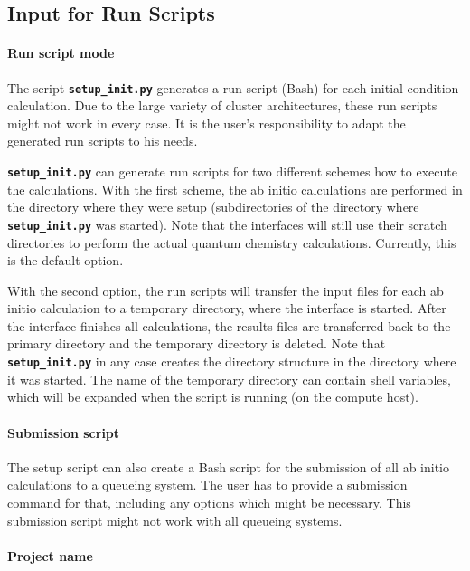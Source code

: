 \documentclass[a4paper,10pt,DIV=15,openany]{scrbook}
\newcommand{\ttt}[1]{\textbf{\texttt{#1}}}
\begin{document}

\subsection{Input for Run Scripts}\label{sec:setup_init.py:run}

\paragraph{Run script mode}

The script \ttt{setup\_init.py} generates a run script (Bash) for each initial condition calculation. Due to the large variety of cluster architectures, these run scripts might not work in every case. It is the user's responsibility to adapt the generated run scripts to his needs.

\ttt{setup\_init.py} can generate run scripts for two different schemes how to execute the calculations. With the first scheme, the ab initio calculations are performed in the directory where they were setup (subdirectories of the directory where \ttt{setup\_init.py} was started). Note that the interfaces will still use their scratch directories to perform the actual quantum chemistry calculations. Currently, this is the default option.

With the second option, the run scripts will transfer the input files for each ab initio calculation to a temporary directory, where the interface is started. After the interface finishes all calculations, the results files are transferred back to the primary directory and the temporary directory is deleted. Note that \ttt{setup\_init.py} in any case creates the directory structure in the directory where it was started. The name of the temporary directory can contain shell variables, which will be expanded when the script is running (on the compute host).

\paragraph{Submission script}

The setup script can also create a Bash script for the submission of all ab initio calculations to a queueing system. The user has to provide a submission command for that, including any options which might be necessary. This submission script might not work with all queueing systems.

\paragraph{Project name}
\end{document}
